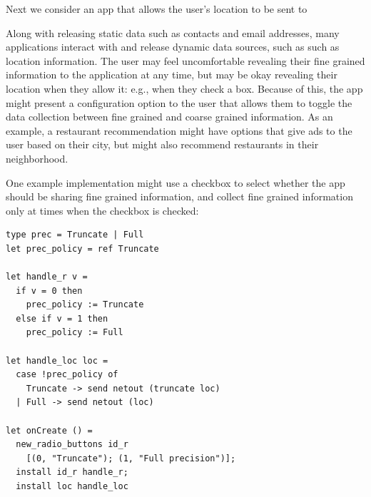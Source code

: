 \documentclass[conference]{IEEEtran}
\theoremstyle{definition}
\begin{document}
Next we consider an app that allows the user's location to be sent to

Along with releasing static data such as contacts and email addresses,
many applications interact with and release dynamic data sources,
such as such as location information.  The user may feel uncomfortable
revealing their fine grained information to the application at any
time, but may be okay revealing their location when they allow it:
e.g., when they check a box.  Because of this, the app might present a
configuration option to the user that allows them to toggle the data
collection between fine grained and coarse grained information.  As an
example, a restaurant recommendation might have options that give ads
to the user based on their city, but might also recommend restaurants
in their neighborhood.

One example implementation might use a checkbox to select whether the
app should be sharing fine grained information, and collect fine
grained information only at times when the checkbox is checked:

\begin{lstlisting}[name=Ex]
type prec = Truncate | Full
let prec_policy = ref Truncate

let handle_r v =
  if v = 0 then
    prec_policy := Truncate
  else if v = 1 then
    prec_policy := Full

let handle_loc loc = 
  case !prec_policy of
    Truncate -> send netout (truncate loc)
  | Full -> send netout (loc)
  
let onCreate () = 
  new_radio_buttons id_r
    [(0, "Truncate"); (1, "Full precision")];
  install id_r handle_r;
  install loc handle_loc
\end{lstlisting}
\end{document}
